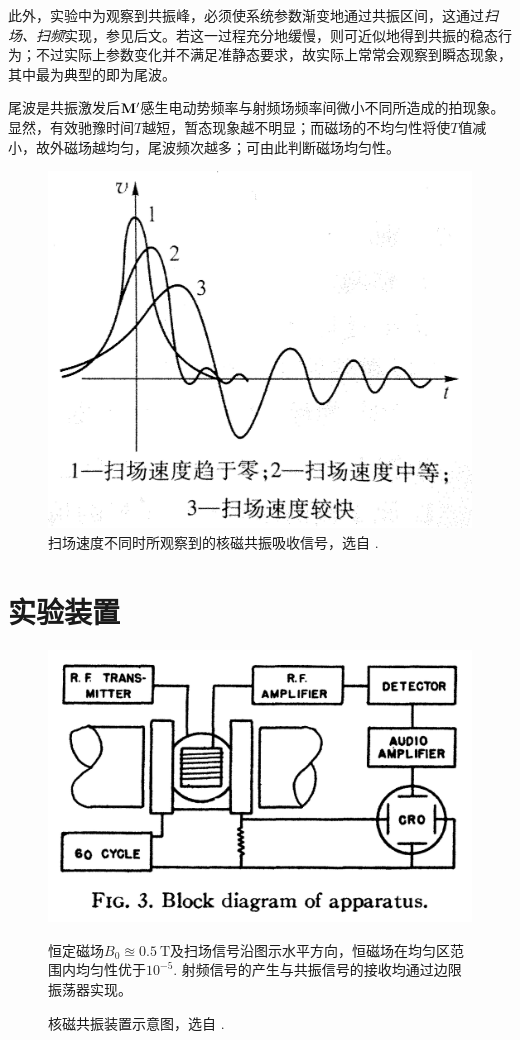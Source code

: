 \documentclass[aps,pre,12pt,preprint,%
	onecolumn,showpacs,showkeys,nofootinbib]{revtex4-1}
\begin{document}
	\newparagraph
	此外，实验中为观察到共振峰，必须使系统参数渐变地通过共振区间，这通过\textit{扫场、扫频}实现，参见后文。若这一过程充分地缓慢，则可近似地得到共振的稳态行为；不过实际上参数变化并不满足准静态要求，故实际上常常会观察到瞬态现象，其中最为典型的即为尾波。
	
	尾波是共振激发后$\vb{M}'$感生电动势频率与射频场频率间微小不同所造成的拍现象。显然，有效驰豫时间$T$越短，暂态现象越不明显；而磁场的不均匀性将使$T$值减小，故外磁场越均匀，尾波频次越多；可由此判断磁场均匀性。
\clearpage
\hfil\vspace{-1.2\baselineskip}
	\begin{figure}[!ht]
	\centering
	\includegraphics[width=.425\linewidth]{img/transient-b.jpg}
	\caption[尾波图像]{扫场速度不同时所观察到的核磁共振吸收信号，选自 \cite{textbook}. }
	\end{figure}
\FloatBarrier
\vspace{-1.2\baselineskip}
\section{实验装置}
\vspace{-1\baselineskip}
	\begin{figure}[!ht]
	\centering
	\includegraphics[width=.5\linewidth]{img/bloch_apparatus.png}
	\caption{核磁共振装置示意图，选自 \cite{PhysRev.70.474}. }
	\begin{explain}
		恒定磁场$B_0\approxeq\SI{0.5}{\tesla}$及扫场信号沿图示水平方向，恒磁场在均匀区范围内均匀性优于$10^{-5}$. 射频信号的产生与共振信号的接收均通过边限振荡器实现。
	\end{explain}
	\end{figure}
	
\end{document}
